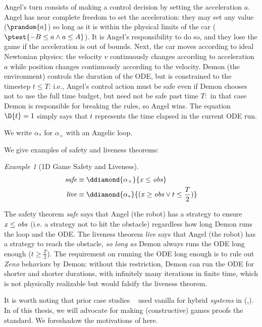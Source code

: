 \documentclass[12pt]{cmuthesis}
\theoremstyle{definition}
\theoremstyle{remark}
\newtheorem{example}{Example}
\newcommand{\rref}[2][]{\prettyref{#2}}
\begin{document}
Angel's turn consists of making a control decision by setting the acceleration $a$.
Angel has near complete freedom to set the acceleration: they may set any value ($\prandom{a}$) so long as it is within the physical limits of the car ($\ptest{-B \leq a \land a \leq A}$).
It is Angel's responsibility to do so, and they lose the game if the acceleration is out of bounds.
Next, the car moves according to ideal Newtonian physics: the velocity $v$ continuously changes according to acceleration $a$ while position changes continuously according to the velocity.
Demon (the environment) controls the duration of the ODE, but is constrained to the timestep $t \leq T$: i.e., Angel's control action must be safe even if Demon chooses not to use the full time budget, but need not be safe past time $T:$ in that case Demon is responsible for breaking the rules, so Angel wins.
The equation $\D{t}=1$ simply says that $t$ represents the time elapsed in the current ODE run.

We write $\alpha_*$ for $\alpha_\times$ with an Angelic loop.

We give examples of safety and liveness theorems:
\begin{example}[1D Game Safety and Liveness]
  \begin{align*}
    \textit{safe} &\equiv \ddiamond{\alpha_\times}{\xvar \leq \obsvar}\\
    \textit{live} &\equiv \ddiamond{\alpha_*}{(\xvar \geq \obsvar \lor t \leq \frac{T}{2})}
  \end{align*}
\end{example}
The safety theorem \emph{safe} says that Angel (the robot) has a strategy to ensure ${\it x} \leq {\it obs}$ (i.e. a strategy not to hit the obstacle) regardless how long Demon runs the loop and the ODE.
The liveness theorem \emph{live} says that Angel (the robot) has a strategy to reach the obstacle, \emph{so long as} Demon always runs the ODE long enough ($t \geq \frac{T}{2}$).
The requirement on running the ODE long enough is to rule out \emph{Zeno} behaviors by Demon: without this restriction, Demon can run the ODE for shorter and shorter durations, with infinitely many iterations in finite time, which is not physically realizable but would falsify the liveness theorem.

It is worth noting that prior case studies ~\cite{DBLP:conf/emsoft/JeanninGKGSZP15,DBLP:conf/fm/LoosPN11,DBLP:conf/rss/MitschGP13,DBLP:conf/hybrid/PlatzerQ08} used vanilla \dL for hybrid \emph{systems} in \KeYmaeraX (\rref{sec:veriphy},\rref{sec:ground-robotics}).
In \rref{ch:cdgl} of this thesis, we will advocate for making (constructive) games proofs the standard.
We foreshadow the motivations of \rref{ch:cdgl} here.
\end{document}
